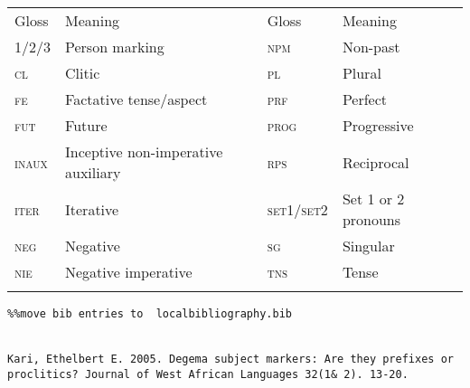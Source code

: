 \documentclass[output=paper]{langsci/langscibook}
\begin{document}
\begin{tabularx}{\textwidth}{XXXX}
\lsptoprule

{Gloss} & {Meaning} & {Gloss} & {Meaning}\\
{\scshape 1/2/3} & {Person marking} & {\scshape npm} & {Non-past }\\
{\scshape cl} & {Clitic} & {\scshape pl} & {Plural }\\
{\scshape fe} & {Factative tense/aspect} & {\scshape prf} & {Perfect }\\
{\scshape fut} & {Future} & {\scshape prog} & {Progressive}\\
{\scshape inaux} & {Inceptive non-imperative auxiliary} & {\scshape rps} & {Reciprocal }\\
{\scshape iter} & {Iterative} & {\scshape set1/set2} & {Set 1 or 2 pronouns}\\
{\scshape neg} & {Negative} & {\scshape sg} & {Singular }\\
{\scshape nie} & {Negative imperative} & {\scshape tns} & {Tense }\\
\lspbottomrule
\end{tabularx}
 


\begin{verbatim}%%move bib entries to  localbibliography.bib 


Kari, Ethelbert E. 2005. Degema subject markers: Are they prefixes or proclitics? Journal of West African Languages 32(1& 2). 13-20.




\end{verbatim}
 
\printbibliography[heading=subbibliography,notkeyword=this]
\end{document}
